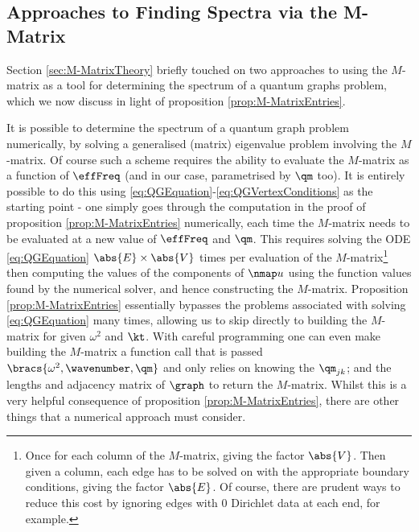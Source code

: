 \subsection{Approaches to Finding Spectra via the M-Matrix} \label{sec:NumericalMethodsDiscussion}
Section \ref{sec:M-MatrixTheory} briefly touched on two approaches to using the $M$-matrix as a tool for determining the spectrum of a quantum graphs problem, which we now discuss in light of proposition \ref{prop:M-MatrixEntries}. \newline

It is possible to determine the spectrum of a quantum graph problem numerically, by solving a generalised (matrix) eigenvalue problem involving the $M$-matrix.
Of course such a scheme requires the ability to evaluate the $M$-matrix as a function of $\effFreq$ (and in our case, parametrised by $\qm$ too).
It is entirely possible to do this using \eqref{eq:QGEquation}-\eqref{eq:QGVertexConditions} as the starting point - one simply goes through the computation in the proof of proposition \ref{prop:M-MatrixEntries} numerically, each time the $M$-matrix needs to be evaluated at a new value of $\effFreq$ and $\qm$.
This requires solving the ODE \eqref{eq:QGEquation} $\abs{E}\times\abs{V}$ times per evaluation of the $M$-matrix\footnote{Once for each column of the $M$-matrix, giving the factor $\abs{V}$. 
Then given a column, each edge has to be solved on with the appropriate boundary conditions, giving the factor $\abs{E}$. 
Of course, there are prudent ways to reduce this cost by ignoring edges with 0 Dirichlet data at each end, for example.}
then computing the values of the components of $\nmap u$ using the function values found by the numerical solver, and hence constructing the $M$-matrix.
Proposition \ref{prop:M-MatrixEntries} essentially bypasses the problems associated with solving \eqref{eq:QGEquation} many times, allowing us to skip directly to building the $M$-matrix for given $\omega^2$ and $\kt$.
With careful programming one can even make building the $M$-matrix a function call that is passed $\bracs{\omega^2, \wavenumber, \qm}$ and only relies on knowing the $\qm_{jk}$; and the lengths and adjacency matrix of $\graph$ to return the $M$-matrix.
Whilst this is a very helpful consequence of proposition \ref{prop:M-MatrixEntries}, there are other things that a numerical approach must consider.

